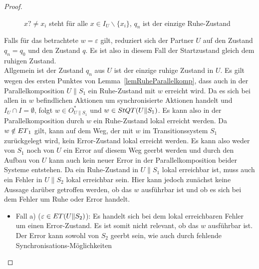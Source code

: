 \begin{proof}
\begin{figure} [h!tbp]
\begin{center}
    \caption{$x?\neq x_i$ steht für alle $x\in I_U\backslash\{x_i\}$, $q_n$
    ist der einzige Ruhe-Zustand}
\label{UohneEmitI}
  \end{center}
  \end{figure}
  Falls für das betrachtete $w =\varepsilon$ gilt, reduziert sich der Partner
  $U$ auf den Zustand $q_n =q_0$ und den Zustand $q$. Es ist also in diesem
  Fall der Startzustand gleich dem ruhigen Zustand.\\
  Allgemein ist der Zustand $q_n$ aus $U$ ist der einzige ruhige Zustand in $U$. Es gilt
  wegen des ersten Punktes von Lemma~\ref{lemRuheParallelkomp}, dass auch in
  der Parallelkomposition $U\|S_1$ ein Ruhe-Zustand mit $w$ erreicht wird. Da
  es sich bei allen in $w$ befindlichen Aktionen um synchronisierte
  Aktionen handelt und $I_U\cap I=\emptyset$, folgt $w\in O_{U\|S_1}^*$ und
  $w\in StQT{}(U\|S_1)$. Es kann also in der Parallelkomposition durch $w$
  ein Ruhe-Zustand lokal erreicht werden. Da $w\notin ET{}_1$ gilt, kann
  auf dem Weg, der mit $w$ im Transitionssystem $S_1$ zurückgelegt wird,
  kein Error-Zustand lokal erreicht werden. Es kann also weder von $S_1$ noch von
  $U$ ein Error auf diesem Weg geerbt werden und durch den Aufbau von $U$
  kann auch kein neuer Error in der Parallelkomposition beider Systeme
  entstehen. Da ein Ruhe-Zustand in $U\|S_1$
  lokal erreichbar ist, muss auch ein Fehler in $U\|S_2$ lokal erreichbar
  sein. Hier kann jedoch zunächst keine Aussage darüber getroffen werden,
  ob das $w$ ausführbar ist und ob es sich bei dem Fehler um Ruhe oder
  Error handelt.
  \begin{itemize}
    \item Fall a) ($\varepsilon\in ET{}(U\|S_2)$): Es handelt sich bei
      dem lokal erreichbaren Fehler um einen Error-Zustand. Es ist somit nicht
      relevant, ob das $w$ ausführbar ist. Der Error kann sowohl von $S_2$
      geerbt sein, wie auch durch fehlende Synchronisations-Möglichkeiten

\end{itemize}
\end{proof}
